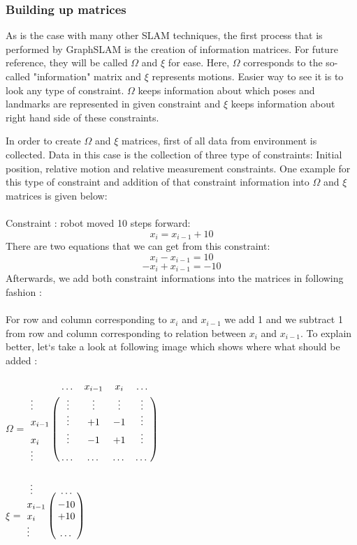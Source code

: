 \documentclass{ba-kecs}
\numberwithin{figure}{section}
\numberwithin{equation}{section}
\begin{document}
\subsubsection{Building up matrices}
As is the case with many other SLAM techniques, the first process that is performed by GraphSLAM is the creation of information matrices. For future reference, they will be called $\Omega$ and $\xi$ for ease. Here, $\Omega$ corresponds to the so-called "information" matrix and $\xi$ represents motions. Easier way to see it is to look any type of constraint. $\Omega$ keeps information about which poses and landmarks are represented in given constraint and $\xi$ keeps information about right hand side of these constraints.
	
In order to create $\Omega$ and $\xi$ matrices, first of all data from environment is collected. Data in this case is the collection of three type of constraints: Initial position, relative motion and relative measurement constraints. One example for this type of constraint and addition of that constraint information into $\Omega$ and $\xi$ matrices is given below:\\ \\
	Constraint : robot moved 10 steps forward: 
	\[ x_{i} = x_{i-1} + 10 \]
	There are two equations that we can get from this constraint:
	\[ x_{i} - x_{i-1} = 10 \]
	\[ -x_{i} + x_{i-1} = -10 \]
	Afterwards, we add both constraint informations into the matrices in following fashion :\\ \\
	For row and column corresponding to $x_{i}$ and $x_{i-1}$ we add 1 and we subtract 1 from row and column corresponding to relation between $x_{i}$ and $x_{i-1}$. To explain better, let`s take a look at following image which shows where what should be added :\\ \\
	$\Omega$ = $\bordermatrix{~ & \dots & x_{i-1} & x_{i} & \dots \cr
							\vdots & \vdots & \vdots & \vdots & \vdots \cr
                  			x_{i-1} & \vdots & +1 & -1 & \vdots \cr
                  			x_{i} & \vdots & -1 & +1 & \vdots \cr
                  			\vdots & \dots & \dots & \dots & \dots \cr}$ \\ \\
                  			
    $\xi$ = $\bordermatrix{~ \vdots & \dots \cr
                  			x_{i-1} & -10 \cr
                  			x_{i}  & +10 \cr
                  			\vdots & \dots \cr}$\\ \\
                  
\end{document}
